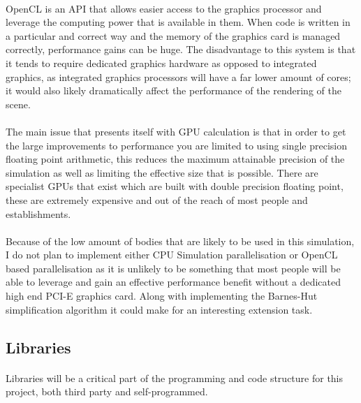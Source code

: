 \paragraph{}
OpenCL is an API that allows easier access to the graphics processor and leverage the computing power that is available in them. When code is written in a particular and correct way and the memory of the graphics card is managed correctly, performance gains can be huge. The disadvantage to this system is that it tends to require dedicated graphics hardware as opposed to integrated graphics, as integrated graphics processors will have a far lower amount of cores; it would also likely dramatically affect the performance of the rendering of the scene.

\paragraph{}
The main issue that presents itself with GPU calculation is that in order to get the large improvements to performance you are limited to using single precision floating point arithmetic, this reduces the maximum attainable precision of the simulation as well as limiting the effective size that is possible. There are specialist GPUs that exist which are built with double precision floating point, these are extremely expensive and out of the reach of most people and establishments.

\paragraph{}
Because of the low amount of bodies that are likely to be used in this simulation, I do not plan to implement either CPU Simulation parallelisation or OpenCL based parallelisation as it is unlikely to be something that most people will be able to leverage and gain an effective performance benefit without a dedicated high end PCI-E graphics card. Along with implementing the Barnes-Hut simplification algorithm it could make for an interesting extension task.

\subsection{Libraries}
\paragraph{}
Libraries will be a critical part of the programming and code structure for this project, both third party and self-programmed.


